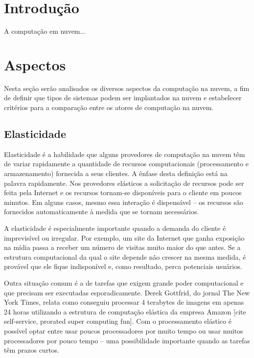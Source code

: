 
\section{Introdução}
A computação em nuvem... \cite{acm:s3,wired:end,akita}

\section{Aspectos}

Nesta seção serão analisados os diversos aspectos da computação na nuvem, a fim de definir que tipos de sistemas podem ser implantados na nuvem e estabelecer critérios para a comparação entre os atores de computação na nuvem.

\subsection{Elasticidade}


Elasticidade é a habilidade que alguns provedores de computação na nuvem têm de variar rapidamente a quantidade de recursos computacionais (processamento e armazenamento) fornecida a seus clientes. A ênfase desta definição está na palavra rapidamente. Nos provedores elásticos a solicitação de recursos pode ser feita pela Internet e os recursos tornam-se disponíveis para o cliente em poucos minutos. Em alguns casos, mesmo essa interação é dispensável -- os recursos são fornecidos automaticamente à medida que se tornam necessários.


A elasticidade é especialmente importante quando a demanda do cliente é imprevisível ou irregular. Por exemplo, um site da Internet que ganha exposição na mídia passa a receber um número de visitas muito maior do que antes. Se a estrutura computacional da qual o site depende não crescer na mesma medida, é provável que ele fique indisponível e, como resultado, perca potenciais usuários.

Outra situação comum é a de tarefas que exigem grande poder computacional e que precisam ser executadas esporadicamente. Derek Gottfrid, do jornal The New York Times, relata como conseguiu processar 4 terabytes de imagens em apenas 24 horas utilizando a estrutura de computação elástica da empresa Amazon [cite self-service, prorated super computing fun]. Com o processamento elástico é possível optar entre usar poucos processadores por muito tempo ou usar muitos processadores por pouco tempo -- uma possibilidade importante quando as tarefas têm prazos curtos.

